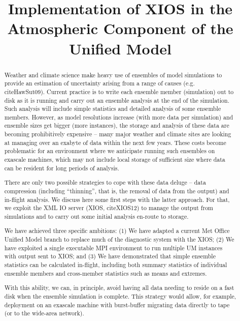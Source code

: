 \documentclass[twocolumn, 12pt]{paper}
\begin{document}
\title{Implementation of XIOS in the Atmospheric Component of the Unified Model}

\begin{abstract}
Weather and climate science make heavy use of ensembles of model simulations to provide an estimation of uncertainty arising from a range of causes (e.g. cite{HawSut09}).
Current practice is to write each ensemble member (simulation) out to disk as it is running and carry out an ensemble analysis at the end of the simulation.
Such analysis will include simple statistics and detailed analysis of some ensemble members.
However, as model resolutions increase (with more data per simulation) and ensemble sizes get bigger (more instances), the storage and analysis of these data are becoming prohibitively expensive -- many major weather and climate sites are looking at managing over an exabyte of data within the next few years.
These costs become problematic for an environment where we anticipate running such ensembles on exascale machines, which may not include local storage of sufficient size where data can be resident for long periods of analysis.

There are only two possible strategies to cope with these data deluge -- data compression (including ``thinning'', that is, the removal of data from the output) and in-flight analysis.
We discuss here some first steps with the latter approach.
For that, we exploit the XML IO server (XIOS, cite{XIOS12}) to manage the output from simulations and to carry out some initial analysis en-route to storage.

We have achieved three specific ambitions: (1) We have adapted a current Met Office Unified Model branch to replace much of the diagnostic system with the XIOS;
(2) We have exploited a single executable MPI environment to run multiple UM instances with output sent to XIOS; and
(3) We have demonstrated that simple ensemble statistics can be calculated in-flight, including both summary statistics of individual ensemble members and cross-member statistics such as means and extremes.

With this ability, we can, in principle, avoid having all data needing to reside on a fast disk when the ensemble simulation is complete.
This strategy would allow, for example, deployment on an exascale machine with burst-buffer migrating data directly to tape (or to the wide-area network).

\end{abstract}

\maketitle
\end{document}
